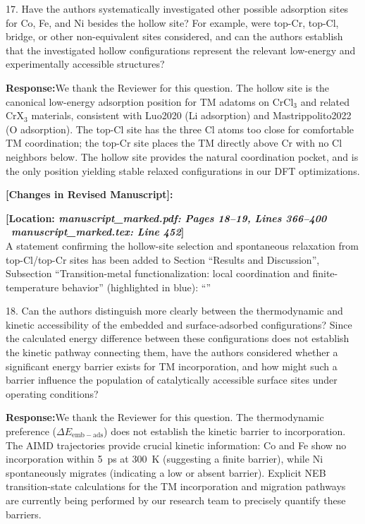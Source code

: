 \documentclass[11pt, sans, a4paper]{moderncv}
\newcommand{\response}{\vspace{0.4em}\noindent\textbf{\color{actionblue}Response:}\hspace{0.5em}}
\newcommand{\manuscriptchange}[1]{{\renewcommand{\label}[1]{}\vspace{0.4em}\noindent\textbf{\color{acsblue}[Changes in Revised Manuscript]:}\par\nopagebreak\vspace{0.15em}#1\vspace{0.4em}}}
\begin{document}
\begin{reviewercomment}
17. Have the authors systematically investigated other possible adsorption sites for Co, Fe, and Ni besides the hollow site? For example, were top-Cr, top-Cl, bridge, or other non-equivalent sites considered, and can the authors establish that the investigated hollow configurations represent the relevant low-energy and experimentally accessible structures?
\end{reviewercomment}

\response We thank the Reviewer for this question. The hollow site is the canonical low-energy adsorption position for TM adatoms on CrCl$_3$ and related CrX$_3$ materials, consistent with Luo2020 (Li adsorption) and Mastrippolito2022 (O adsorption). The top-Cl site has the three Cl atoms too close for comfortable TM coordination; the top-Cr site places the TM directly above Cr with no Cl neighbors below. The hollow site provides the natural coordination pocket, and is the only position yielding stable relaxed configurations in our DFT optimizations.

\manuscriptchange{\textbf{[Location: \textit{manuscript\_marked.pdf: Pages 18--19, Lines 366--400} \textbar\ \textit{manuscript\_marked.tex: Line 452}]}\\ A statement confirming the hollow-site selection and spontaneous relaxation from top-Cl/top-Cr sites has been added to Section ``Results and Discussion'', Subsection ``Transition-metal functionalization: local coordination and finite-temperature behavior'' (highlighted in blue): ``{\itshape \ExecuteMetaData[manuscript_marked.tex]{HollowSiteSelection}}''}

\vspace{0.8em}

\begin{reviewercomment}
18. Can the authors distinguish more clearly between the thermodynamic and kinetic accessibility of the embedded and surface-adsorbed configurations? Since the calculated energy difference between these configurations does not establish the kinetic pathway connecting them, have the authors considered whether a significant energy barrier exists for TM incorporation, and how might such a barrier influence the population of catalytically accessible surface sites under operating conditions?
\end{reviewercomment}

\response We thank the Reviewer for this question. The thermodynamic preference ($\Delta E_{\mathrm{emb-ads}}$) does not establish the kinetic barrier to incorporation. The AIMD trajectories provide crucial kinetic information: Co and Fe show no incorporation within 5~ps at 300~K (suggesting a finite barrier), while Ni spontaneously migrates (indicating a low or absent barrier). Explicit NEB transition-state calculations for the TM incorporation and migration pathways are currently being performed by our research team to precisely quantify these barriers.
\end{document}
